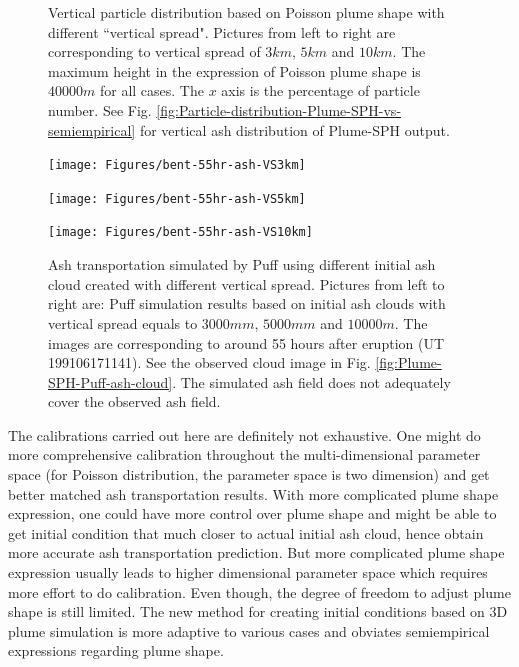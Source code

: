 \documentclass[draft,linenumbers]{agujournal2019}
\begin{document}
\begin{figure}[!htb]
\begin{minipage}{.325 \textwidth}
    \end{minipage}%
    \caption{Vertical particle distribution based on Poisson plume shape with different ``vertical spread". Pictures from left to right are corresponding to vertical spread of $3km$, $5km$ and $10 km$. The maximum height in the expression of Poisson plume shape is $40000 m$ for all cases. The $x$ axis is the percentage of particle number. See Fig. \ref{fig:Particle-distribution-Plume-SPH-vs-semiempirical} for vertical ash distribution of Plume-SPH output.}
    \label{fig:poisson-vertical-spread}
\end{figure}

\begin{figure}[!htb]
    \centering
    \begin{minipage}{.325\textwidth}
        \centering
        \texttt{[image: Figures/bent-55hr-ash-VS3km]}
    \end{minipage}%
    \begin{minipage}{.325 \textwidth}
        \centering
        \texttt{[image: Figures/bent-55hr-ash-VS5km]}
    \end{minipage}%
    \begin{minipage}{.325 \textwidth}
        \centering
        \texttt{[image: Figures/bent-55hr-ash-VS10km]}
    \end{minipage}%
    \caption{Ash transportation simulated by Puff using different initial ash cloud created with different vertical spread. Pictures from left to right are: Puff simulation results based on initial ash clouds with vertical spread equals to $3000m m$, $5000m m$ and $10000 m$. The images are corresponding to around 55 hours after eruption (UT 199106171141). See the observed cloud image in Fig. \ref{fig:Plume-SPH-Puff-ash-cloud}. The simulated ash field does not adequately cover the observed ash field.}
    \label{fig:Various-vertical-spread-Pinatubo-ash-cloud}
\end{figure}

The calibrations carried out here are definitely not exhaustive. One might do more comprehensive calibration throughout the multi-dimensional parameter space (for Poisson distribution, the parameter space is two dimension) and get better matched ash transportation results. With more complicated plume shape expression, one could have more control over plume shape and might be able to get initial condition that much closer to actual initial ash cloud, hence obtain more accurate ash transportation prediction. But more complicated plume shape expression usually leads to higher dimensional parameter space which requires more effort to do calibration. Even though, the degree of freedom to adjust plume shape is still limited. The new method for creating initial conditions based on 3D plume simulation is more adaptive to various cases and obviates semiempirical expressions regarding plume shape.
\end{document}

